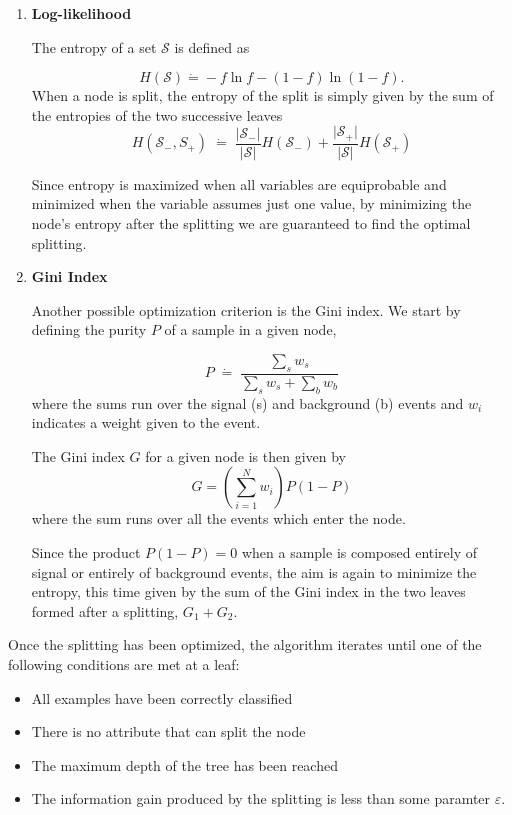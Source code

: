 \documentclass[10pt,a4paper]{book}
\begin{document}
\begin{enumerate}

\item \textbf{Log-likelihood}

The entropy of a set $\mathcal{S}$ is defined as

\begin{equation}
H(\mathcal{S}) \dot{=} -f\ln f - (1 - f)\ln (1-f).
\end{equation}
When a node is split, the entropy of the split is simply given by the sum of the entropies of the two successive leaves
\begin{equation}
H(\mathcal{S}_{-}, S_+) \; \dot{=} \;\frac{\vert \mathcal{S}_{-}\vert }{\vert \mathcal{S}\vert}H(\mathcal{S}_{-}) +\frac{\vert \mathcal{S}_{+}\vert }{\vert \mathcal{S}\vert}H(\mathcal{S}_{+})
\end{equation}

Since entropy is maximized when all variables are equiprobable and minimized when the variable assumes just one value, by minimizing the node's entropy after the splitting we are guaranteed to find the optimal splitting.

\item \textbf{Gini Index}

Another possible optimization criterion is the Gini index. We start by defining the purity $P$ of a sample in a given node,

\begin{equation}
P \; \dot{=} \; \frac{\sum_s w_s}{\sum_s w_s + \sum_b w_b}
\end{equation}
where the sums run over the signal (s) and background (b) events and $w_i$ indicates a weight given to the event. 

The Gini index $G$ for a given node is then given by 
\begin{equation}
G = \left(\sum_{i = 1}^N w_i \right) P(1-P)
\end{equation}
where the sum runs over all the events which enter the node.

Since the product $P(1-P) = 0$ when a sample is composed entirely of signal or entirely of background events, the aim is again to minimize the entropy, this time given by the sum of the Gini index in the two leaves formed after a splitting, $G_1 + G_2$.
\end{enumerate}

Once the splitting has been optimized, the algorithm iterates until one of the following conditions are met at a leaf:
\begin{itemize}
\item All examples have been correctly classified
\item There is no attribute that can split the node
\item The maximum depth of the tree has been reached
\item The information gain produced by the splitting is less than some paramter $\varepsilon$.
\end{itemize}
\end{document}
